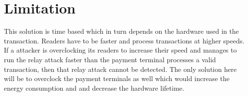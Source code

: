 \documentclass[conference]{IEEEtran}
\begin{document}
%


\section{Limitation}
This solution is time based which in turn depends on the hardware used in the transaction. Readers have to be faster and process transactions at higher speeds. If a attacker is overclocking its readers to increase their speed and manages to run the relay attack faster than the payment terminal processes a valid transaction, then that relay attack cannot be detected. The only solution here will be to overclock the payment terminals as well which would increase the energy consumption and and decrease the hardware lifetime. 
 
\end{document}
